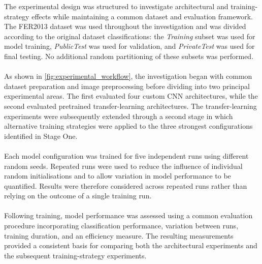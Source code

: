 \documentclass[12pt, a4paper]{report}
\begin{document}
			The experimental design was structured to investigate architectural and training-strategy effects while maintaining a common dataset and evaluation framework. The FER2013 dataset was used throughout the investigation and was divided according to the original dataset classifications: the \textit{Training} subset was used for model training, \textit{PublicTest} was used for validation, and \textit{PrivateTest} was used for final testing. No additional random partitioning of these subsets was performed.\\\\
			As shown in \cref{fig:experimental_workflow}, the investigation began with common dataset preparation and image preprocessing before dividing into two principal experimental areas. The first evaluated four custom CNN architectures, while the second evaluated pretrained transfer-learning architectures. The transfer-learning experiments were subsequently extended through a second stage in which alternative training strategies were applied to the three strongest configurations identified in Stage One.\\\\
			Each model configuration was trained for five independent runs using different random seeds. Repeated runs were used to reduce the influence of individual random initialisations and to allow variation in model performance to be quantified. Results were therefore considered across repeated runs rather than relying on the outcome of a single training run.\\\\
			Following training, model performance was assessed using a common evaluation procedure incorporating classification performance, variation between runs, training duration, and an efficiency measure. The resulting measurements provided a consistent basis for comparing both the architectural experiments and the subsequent training-strategy experiments.
			
\end{document}
